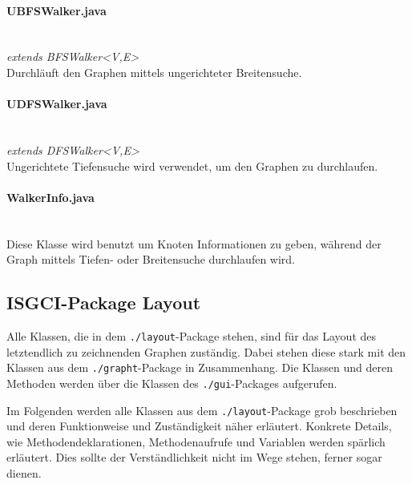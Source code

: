 \documentclass[10pt,a4paper]{article}
\begin{document}
\paragraph{UBFSWalker.java}\ \\
\emph{ extends BFSWalker<V,E>}\\
Durchläuft den Graphen mittels ungerichteter Breitensuche.\\
\paragraph{UDFSWalker.java}\ \\
\emph{extends DFSWalker<V,E>}\\
Ungerichtete Tiefensuche wird verwendet, um den Graphen zu durchlaufen.\\
\paragraph{WalkerInfo.java}\ \\
Diese Klasse wird benutzt um Knoten Informationen zu geben, während der Graph mittels Tiefen- oder Breitensuche durchlaufen wird.

\subsection{ISGCI-Package Layout}

Alle Klassen, die in dem \texttt{./layout}-Package stehen, sind für das Layout des letztendlich zu zeichnenden Graphen zuständig. Dabei stehen diese stark mit den Klassen aus dem \texttt{./grapht}-Package in Zusammenhang. Die Klassen und deren Methoden werden über die Klassen des \texttt{./gui}-Packages aufgerufen.

Im Folgenden werden alle Klassen aus dem \texttt{./layout}-Package grob beschrieben und deren Funktionweise und Zuständigkeit näher erläutert. Konkrete Details, wie Methodendeklarationen, Methodenaufrufe und Variablen werden spärlich erläutert. Dies sollte der Verständlichkeit nicht im Wege stehen, ferner sogar dienen.
\end{document}
